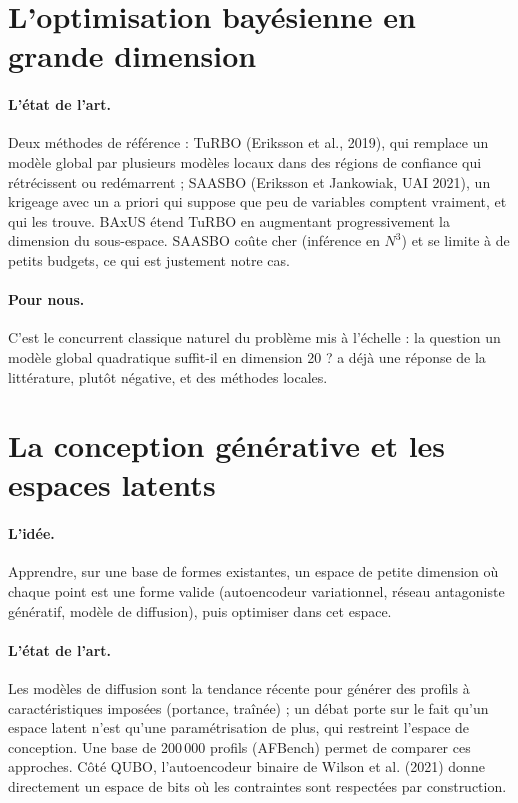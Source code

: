 \section{L'optimisation bayésienne en grande dimension}
\paragraph{L'état de l'art.} Deux méthodes de référence : TuRBO (Eriksson et al., 2019), qui remplace un modèle global par plusieurs modèles locaux dans des régions de confiance qui rétrécissent ou redémarrent ; SAASBO (Eriksson et Jankowiak, UAI 2021), un krigeage avec un a priori qui suppose que peu de variables comptent vraiment, et qui les trouve. BAxUS étend TuRBO en augmentant progressivement la dimension du sous-espace. SAASBO coûte cher (inférence en $N^3$) et se limite à de petits budgets, ce qui est justement notre cas.
\paragraph{Pour nous.} C'est le concurrent classique naturel du problème mis à l'échelle : la question \og un modèle global quadratique suffit-il en dimension 20 ?\fg{} a déjà une réponse de la littérature, plutôt négative, et des méthodes locales.

\section{La conception générative et les espaces latents}
\paragraph{L'idée.} Apprendre, sur une base de formes existantes, un espace de petite dimension où chaque point est une forme valide (autoencodeur variationnel, réseau antagoniste génératif, modèle de diffusion), puis optimiser dans cet espace.
\paragraph{L'état de l'art.} Les modèles de diffusion sont la tendance récente pour générer des profils à caractéristiques imposées (portance, traînée) ; un débat porte sur le fait qu'un espace latent n'est qu'une paramétrisation de plus, qui restreint l'espace de conception. Une base de 200\,000 profils (AFBench) permet de comparer ces approches. Côté QUBO, l'autoencodeur binaire de Wilson et al. (2021) donne directement un espace de bits où les contraintes sont respectées par construction.

